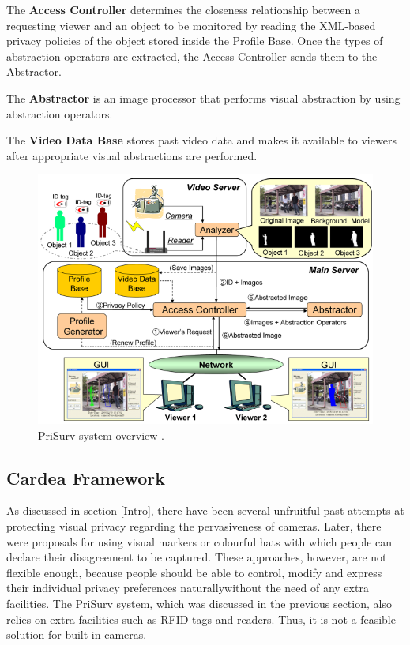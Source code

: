 \documentclass[conference, 11pt]{IEEEtran}
\begin{document}
The \textbf{Access Controller} determines the closeness relationship between a requesting viewer and an object to be monitored by reading the \ac{XML}-based privacy policies of the object stored inside the Profile Base. Once the types of abstraction operators are extracted, the Access Controller sends them to the Abstractor. 

The \textbf{Abstractor} is an image processor that performs visual abstraction by using abstraction operators. 

The \textbf{Video Data Base} stores past video data and makes it available to viewers after appropriate visual abstractions are performed. 

\begin{figure}[t]
\centerline{\includegraphics[width=.5\textwidth]{img//prisurv_arch.png}}
\caption{PriSurv system overview \cite{chinomi2008PriSurv}.}
\label{fig:prisurv2}
\end{figure}

\subsection{Cardea Framework}\label{Cardea}
As discussed in section \ref{Intro}, there have been several unfruitful past attempts at protecting visual privacy regarding the pervasiveness of cameras. Later, there were proposals for using visual markers \cite{roesner2014, liu2014} or colourful hats \cite{sastry2007} with which people can declare their disagreement to be captured. These approaches, however, are not flexible enough, because people should be able to control, modify and express their individual privacy preferences naturally\textemdash without the need of any extra facilities. The PriSurv system, which was discussed in the previous section, also relies on extra facilities such as \ac{RFID}-tags and readers. Thus, it is not a feasible solution for built-in cameras. 
\end{document}
